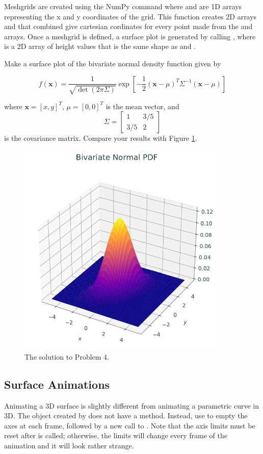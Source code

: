 Meshgrids are created using the NumPy command  where  and  are 1D arrays representing the x and y coordinates of the grid.
This function creates 2D arrays  and  that combined give cartesian cordinates for every point made from the  and  arrays. 
Once a meshgrid is defined, a surface plot is generated by calling , where  is a 2D array of height values that is the same shape as  and . 

\begin{problem}
Make a surface plot of the bivariate normal density function given by

$$f(\mathbf{x})=\frac{1}{\sqrt{\det(2\pi \Sigma)}}\exp{\left[-\frac{1}{2}(\mathbf{x} - \mu)^T \Sigma^{-1} (\mathbf{x} - \mu)\right]}$$

where $\mathbf{x}=[x,y]^T$, $\mu=[0,0]^T$ is the mean vector, and $$\Sigma = \begin{bmatrix} 1 & 3/5 \\ 3/5 & 2 \end{bmatrix}$$ is the covariance matrix. Compare your results with Figure \ref{lab0:surf}.
\end{problem}

\begin{figure}[H]
\centering
\includegraphics[width=100mm]{figures/normal_density.pdf}
\caption{The solution to Problem 4.}
\label{lab0:surf}
\end{figure}

\subsection*{Surface Animations}
Animating a 3D surface is slightly different from animating a parametric curve in 3D.
The object created by  does not have a  method.
Instead, use  to empty the axes at each frame, followed by a new call to .
Note that the axis limits must be reset after  is called; otherwise, the limits will change every frame of the animation and it will look rather strange.

